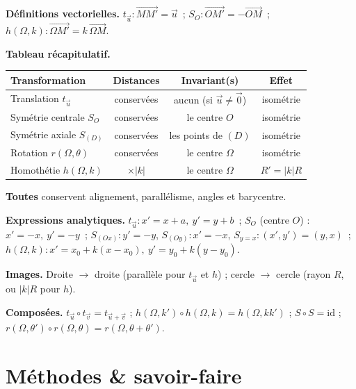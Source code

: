 \begin{synthese}
\textbf{Définitions vectorielles.}
$t_{\vec u}:\overrightarrow{MM'}=\vec u$\ ;\quad
$S_O:\overrightarrow{OM'}=-\overrightarrow{OM}$\ ;\quad
$h(\Omega,k):\overrightarrow{\Omega M'}=k\,\overrightarrow{\Omega M}$.

\smallskip
\textbf{Tableau récapitulatif.}
\begin{center}\renewcommand{\arraystretch}{1.35}
\color{white}
\begin{tabular}{@{}l c c c@{}}
\toprule
\textbf{Transformation} & \textbf{Distances} & \textbf{Invariant(s)} & \textbf{Effet} \\
\midrule
Translation $t_{\vec u}$        & conservées      & aucun (si $\vec u\neq\vec 0$) & isométrie \\
Symétrie centrale $S_O$         & conservées      & le centre $O$                 & isométrie \\
Symétrie axiale $S_{(D)}$       & conservées      & les points de $(D)$           & isométrie \\
Rotation $r(\Omega,\theta)$     & conservées      & le centre $\Omega$            & isométrie \\
Homothétie $h(\Omega,k)$        & $\times|k|$     & le centre $\Omega$            & $R'=|k|R$ \\
\bottomrule
\end{tabular}
\end{center}

\smallskip
\textbf{Toutes} conservent alignement, parallélisme, angles et barycentre.

\smallskip
\textbf{Expressions analytiques.}
$t_{\vec u}:x'=x+a,\ y'=y+b$\ ;\quad
$S_O$ (centre $O$) : $x'=-x,\ y'=-y$\ ;\quad
$S_{(Ox)}:y'=-y$, $S_{(Oy)}:x'=-x$, $S_{y=x}:(x',y')=(y,x)$\ ;\quad
$h(\Omega,k):x'=x_0+k(x-x_0),\ y'=y_0+k(y-y_0)$.

\smallskip
\textbf{Images.} Droite $\to$ droite (parallèle pour $t_{\vec u}$ et $h$) ;
cercle $\to$ cercle (rayon $R$, ou $|k|R$ pour $h$).

\smallskip
\textbf{Composées.} $t_{\vec u}\circ t_{\vec v}=t_{\vec u+\vec v}$ ;
$h(\Omega,k')\circ h(\Omega,k)=h(\Omega,kk')$ ;
$S\circ S=\mathrm{id}$ ;
$r(\Omega,\theta')\circ r(\Omega,\theta)=r(\Omega,\theta+\theta')$.
\end{synthese}

\section{Méthodes \& savoir-faire}

